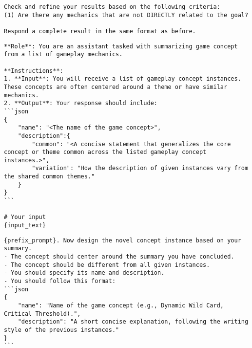 \begin{tcolorbox}[
breakable,
title=System Prompt for reflecting on logic extraction,  
colframe=promptcolor, 
colback=white,
]
\begin{lstlisting}[]
Check and refine your results based on the following criteria:
(1) Are there any mechanics that are not DIRECTLY related to the goal?

Respond a complete result in the same format as before.
\end{lstlisting}
\end{tcolorbox}


\begin{tcolorbox}[
breakable,
title=System Prompt for concept summary,  
colframe=promptcolor, 
colback=white,
]
\begin{lstlisting}[]
**Role**: You are an assistant tasked with summarizing game concept from a list of gameplay mechanics.

**Instructions**:
1. **Input**: You will receive a list of gameplay concept instances. These concepts are often centered around a theme or have similar mechanics.
2. **Output**: Your response should include:
```json
{
    "name": "<The name of the game concept>",
    "description":{
        "common": "<A concise statement that generalizes the core concept or theme common across the listed gameplay concept instances.>",
        "variation": "How the description of given instances vary from the shared common themes."
    }
}
```

# Your input
{input_text}
\end{lstlisting}
\end{tcolorbox}


\begin{tcolorbox}[
breakable,
title=System Prompt for designing new logic instances,  
colframe=promptcolor, 
colback=white,
]
\begin{lstlisting}[]
{prefix_prompt}. Now design the novel concept instance based on your summary. 
- The concept should center around the summary you have concluded.
- The concept should be different from all given instances.
- You should specify its name and description. 
- You should follow this format:
```json
{
    "name": "Name of the game concept (e.g., Dynamic Wild Card, Critical Threshold).",
    "description": "A short concise explanation, following the writing style of the previous instances."
}
```
\end{lstlisting}
\end{tcolorbox}

